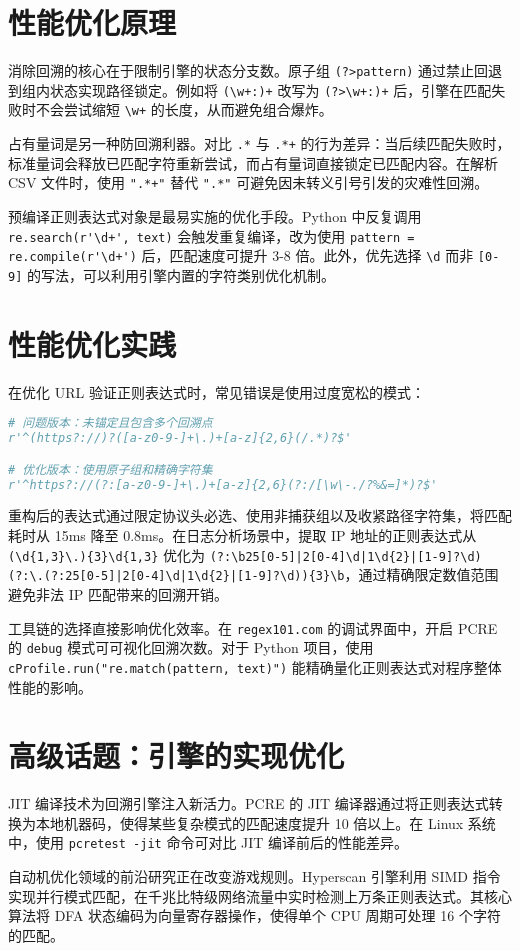 \chapter{性能优化原理}
消除回溯的核心在于限制引擎的状态分支数。原子组 \verb!(?>pattern)! 通过禁止回退到组内状态实现路径锁定。例如将 \verb!(\w+:)+! 改写为 \verb!(?>\w+:)+! 后，引擎在匹配失败时不会尝试缩短 \verb!\w+! 的长度，从而避免组合爆炸。\par
占有量词是另一种防回溯利器。对比 \verb!.*! 与 \verb!.*+! 的行为差异：当后续匹配失败时，标准量词会释放已匹配字符重新尝试，而占有量词直接锁定已匹配内容。在解析 CSV 文件时，使用 \verb!".*+"! 替代 \verb!".*"! 可避免因未转义引号引发的灾难性回溯。\par
预编译正则表达式对象是最易实施的优化手段。Python 中反复调用 \verb!re.search(r'\d+', text)! 会触发重复编译，改为使用 \verb!pattern = re.compile(r'\d+')! 后，匹配速度可提升 3-8 倍。此外，优先选择 \verb!\d! 而非 \verb![0-9]! 的写法，可以利用引擎内置的字符类别优化机制。\par
\chapter{性能优化实践}
在优化 URL 验证正则表达式时，常见错误是使用过度宽松的模式：\par
\begin{lstlisting}[language=python]
# 问题版本：未锚定且包含多个回溯点
r'^(https?://)?([a-z0-9-]+\.)+[a-z]{2,6}(/.*)?$'

# 优化版本：使用原子组和精确字符集
r'^https?://(?:[a-z0-9-]+\.)+[a-z]{2,6}(?:/[\w\-./?%&=]*)?$'
\end{lstlisting}
重构后的表达式通过限定协议头必选、使用非捕获组以及收紧路径字符集，将匹配耗时从 15ms 降至 0.8ms。在日志分析场景中，提取 IP 地址的正则表达式从 \verb!(\d{1,3}\.){3}\d{1,3}! 优化为 \verb!(?:\b25[0-5]|2[0-4]\d|1\d{2}|[1-9]?\d)(?:\.(?:25[0-5]|2[0-4]\d|1\d{2}|[1-9]?\d)){3}\b!，通过精确限定数值范围避免非法 IP 匹配带来的回溯开销。\par
工具链的选择直接影响优化效率。在 \verb!regex101.com! 的调试界面中，开启 PCRE 的 \verb!debug! 模式可可视化回溯次数。对于 Python 项目，使用 \verb!cProfile.run("re.match(pattern, text)")! 能精确量化正则表达式对程序整体性能的影响。\par
\chapter{高级话题：引擎的实现优化}
JIT 编译技术为回溯引擎注入新活力。PCRE 的 JIT 编译器通过将正则表达式转换为本地机器码，使得某些复杂模式的匹配速度提升 10 倍以上。在 Linux 系统中，使用 \verb!pcretest -jit! 命令可对比 JIT 编译前后的性能差异。\par
自动机优化领域的前沿研究正在改变游戏规则。Hyperscan 引擎利用 SIMD 指令实现并行模式匹配，在千兆比特级网络流量中实时检测上万条正则表达式。其核心算法将 DFA 状态编码为向量寄存器操作，使得单个 CPU 周期可处理 16 个字符的匹配。\par
